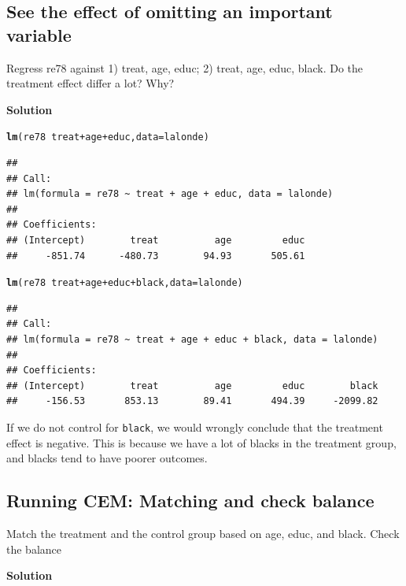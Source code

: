 \documentclass{article}\usepackage[]{graphicx}\usepackage[]{color}
\makeatletter
\newcommand{\hlopt}[1]{\textcolor[rgb]{0,0,0}{#1}}%
\newcommand{\hlstd}[1]{\textcolor[rgb]{0.345,0.345,0.345}{#1}}%
\newcommand{\hlkwc}[1]{\textcolor[rgb]{0.333,0.667,0.333}{#1}}%
\newcommand{\hlkwd}[1]{\textcolor[rgb]{0.737,0.353,0.396}{\textbf{#1}}}%
\newenvironment{kframe}{%
 \def\at@end@of@kframe{}%
 \ifinner\ifhmode%
  \def\at@end@of@kframe{\end{minipage}}%
  \begin{minipage}{\columnwidth}%
 \fi\fi%
 \def\FrameCommand##1{\hskip\@totalleftmargin \hskip-\fboxsep
 \colorbox{shadecolor}{##1}\hskip-\fboxsep
     \hskip-\linewidth \hskip-\@totalleftmargin \hskip\columnwidth}%
 \MakeFramed {\advance\hsize-\width
   \@totalleftmargin\z@ \linewidth\hsize
   \@setminipage}}%
 {\par\unskip\endMakeFramed%
 \at@end@of@kframe}
\newenvironment{knitrout}{}{} %
\makeatother
\begin{document}
\subsection{See the effect of omitting an important variable}

Regress re78 against 1) treat, age, educ; 2) treat, age, educ, black. Do the treatment effect differ a lot? Why?

\textbf{Solution}

\begin{knitrout}
\color{fgcolor}\begin{kframe}
\begin{alltt}
\hlkwd{lm}\hlstd{(re78} \hlopt{~} \hlstd{treat} \hlopt{+} \hlstd{age} \hlopt{+} \hlstd{educ,} \hlkwc{data} \hlstd{= lalonde)}
\end{alltt}
\begin{verbatim}
## 
## Call:
## lm(formula = re78 ~ treat + age + educ, data = lalonde)
## 
## Coefficients:
## (Intercept)        treat          age         educ  
##     -851.74      -480.73        94.93       505.61
\end{verbatim}
\begin{alltt}
\hlkwd{lm}\hlstd{(re78} \hlopt{~} \hlstd{treat} \hlopt{+} \hlstd{age} \hlopt{+} \hlstd{educ} \hlopt{+} \hlstd{black,} \hlkwc{data} \hlstd{= lalonde)}
\end{alltt}
\begin{verbatim}
## 
## Call:
## lm(formula = re78 ~ treat + age + educ + black, data = lalonde)
## 
## Coefficients:
## (Intercept)        treat          age         educ        black  
##     -156.53       853.13        89.41       494.39     -2099.82
\end{verbatim}
\end{kframe}
\end{knitrout}

If we do not control for \verb`black`, we would wrongly conclude that the treatment effect is negative. This is because we have a lot of blacks in the treatment group, and blacks tend to have poorer outcomes.

\subsection{Running CEM: Matching and check balance}

Match the treatment and the control group based on age, educ, and black. Check the balance

\textbf{Solution}
\end{document}
